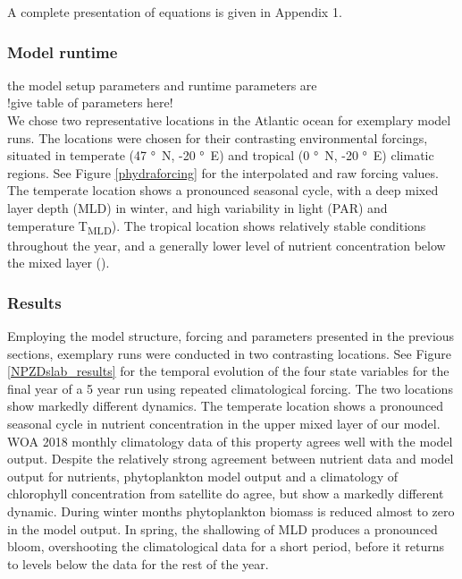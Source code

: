 \documentclass[template.tex]{subfiles}
\begin{document}
A complete presentation of equations is given in Appendix 1.\\


\subsubsection{Model runtime}
the model setup parameters and runtime parameters are
\\
!give table of parameters here!\\


We chose two representative locations in the Atlantic ocean for exemplary model runs. The locations were chosen for their contrasting environmental forcings, situated in temperate (47 \unit{\degree N}, -20 \unit{\degree E}) and tropical (0 \unit{\degree N}, -20 \unit{\degree E}) climatic regions. 
See Figure \ref{phydraforcing} for the interpolated and raw forcing values. The temperate location shows a pronounced seasonal cycle, with a deep mixed layer depth (MLD) in winter, and high variability in light (PAR) and temperature \unit{T_{MLD}}). The tropical location shows relatively stable conditions throughout the year, and a generally lower level of nutrient concentration below the mixed layer ().\\



\subsubsection{Results}
Employing the model structure, forcing and parameters presented in the previous sections, exemplary runs were conducted in two contrasting locations. See Figure \ref{NPZDslab_results} for the temporal evolution of the four state variables for the final year of a 5 year run using repeated climatological forcing. 
The two locations show markedly different dynamics. The temperate location shows a pronounced seasonal cycle in nutrient concentration in the upper mixed layer of our model. WOA 2018 monthly climatology data of this property agrees well with the model output. Despite the relatively strong agreement between nutrient data and model output for nutrients, phytoplankton model output and a climatology of chlorophyll concentration from satellite do agree, but show a markedly different dynamic. During winter months phytoplankton biomass is reduced almost to zero in the model output. In spring, the shallowing of MLD produces a pronounced bloom, overshooting the climatological data for a short period, before it returns to levels below the data for the rest of the year. 
\end{document}
